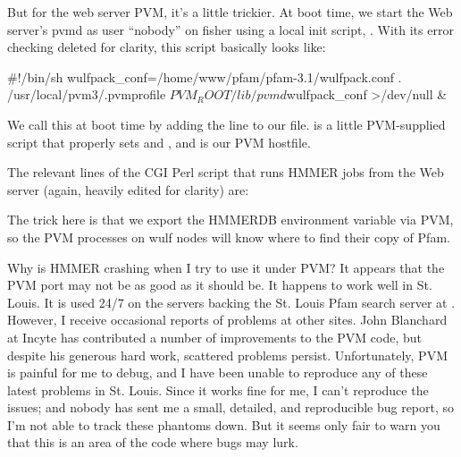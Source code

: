 But for the web server PVM, it's a little trickier. At boot time, we
start the Web server's pvmd as user ``nobody'' on fisher using a local
init script, . With its error
checking deleted for clarity, this script basically looks like:

\begin{sreoutput}
#!/bin/sh
wulfpack_conf=/home/www/pfam/pfam-3.1/wulfpack.conf
. /usr/local/pvm3/.pvmprofile
$PVM_ROOT/lib/pvmd $wulfpack_conf >/dev/null &
\end{sreoutput}

We call this at boot time by adding the line  to our 
file.  is a little PVM-supplied script that properly
sets  and , and 
is our PVM hostfile.

The relevant lines of the CGI Perl script that runs HMMER jobs from
the Web server (again, heavily edited for clarity) are:


The trick here is that we export the HMMERDB environment variable via
PVM, so the PVM processes on wulf nodes will know where to find their
copy of Pfam.

\begin{srefaq}{Why is HMMER crashing when I try to use it under PVM?}
It appears that the PVM port may not be as good as it should be. It
happens to work well in St. Louis. It is used 24/7 on the servers
backing the St. Louis Pfam search server at
.
However, I receive occasional reports of problems at other
sites. John Blanchard at Incyte has contributed a number of
improvements to the PVM code, but despite his generous hard work, scattered problems
persist. Unfortunately, PVM is painful for me to debug, and I have been
unable to reproduce any of these latest problems in St. Louis. Since it works
fine for me, I can't reproduce the issues; and nobody has sent me a small,
detailed, and reproducible bug report, so I'm not able to track these
phantoms down. But it seems only fair to warn you that this is an area
of the code where bugs may lurk.
\end{srefaq}

